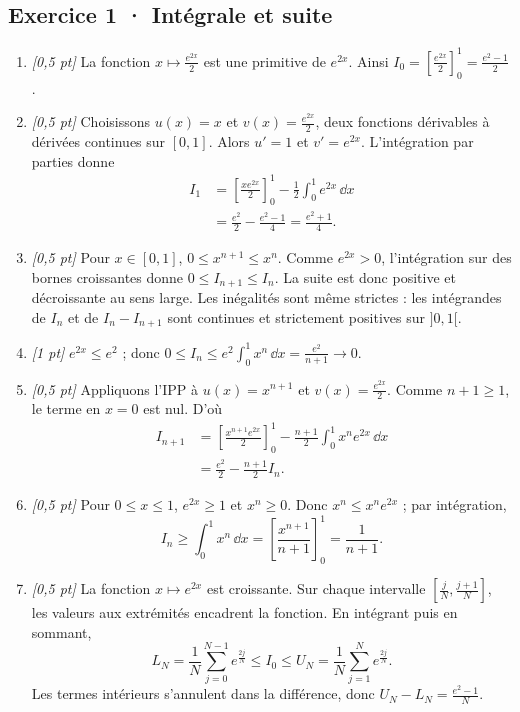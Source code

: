 \subsection*{Exercice 1 · Intégrale et suite}\begin{enumerate}

\item \textit{[0,5 pt]} La fonction $x\mapsto \frac{e^{2x}}{2}$ est une primitive de $e^{2x}$. Ainsi $I_0=[\frac{e^{2x}}{2}]_0^1=\frac{e^{2}-1}{2}$.

\item \textit{[0,5 pt]} Choisissons $u(x)=x$ et $v(x)=\frac{e^{2x}}{2}$, deux fonctions dérivables à dérivées continues sur $[0,1]$. Alors $u'=1$ et $v'=e^{2x}$. L'intégration par parties donne
\[\begin{aligned}I_1&=\left[\frac{xe^{2x}}{2}\right]_0^1-\frac{1}{2}\int_0^1e^{2x}\,\dd x\\&=\frac{e^{2}}{2}-\frac{e^{2}-1}{4}=\frac{e^{2}+1}{4}.\end{aligned}\]

\item \textit{[0,5 pt]} Pour $x\in[0,1]$, $0\le x^{n+1}\le x^n$. Comme $e^{2x}>0$, l'intégration sur des bornes croissantes donne $0\le I_{n+1}\le I_n$. La suite est donc positive et décroissante au sens large. Les inégalités sont même strictes : les intégrandes de $I_n$ et de $I_n-I_{n+1}$ sont continues et strictement positives sur $]0,1[$.

\item \textit{[1 pt]} $e^{2x}\le e^{2}$ ; donc $0\le I_n\le e^{2}\int_0^1x^n\,\dd x=\frac{e^{2}}{n+1}\to0$.

\item \textit{[0,5 pt]} Appliquons l'IPP à $u(x)=x^{n+1}$ et $v(x)=\frac{e^{2x}}{2}$. Comme $n+1\ge1$, le terme en $x=0$ est nul. D'où
\[\begin{aligned}I_{n+1}&=\left[\frac{x^{n+1}e^{2x}}{2}\right]_0^1-\frac{n+1}{2}\int_0^1x^ne^{2x}\,\dd x\\&=\frac{e^{2}}{2}-\frac{n+1}{2}I_n.\end{aligned}\]

\item \textit{[0,5 pt]} Pour $0\le x\le1$, $e^{2x}\ge1$ et $x^n\ge0$. Donc $x^n\le x^ne^{2x}$ ; par intégration,
\[I_n\ge\int_0^1x^n\,\dd x=\left[\frac{x^{n+1}}{n+1}\right]_0^1=\frac{1}{n+1}.\]

\item \textit{[0,5 pt]} La fonction $x\mapsto e^{2x}$ est croissante. Sur chaque intervalle $[\frac{j}{N},\frac{j+1}{N}]$, les valeurs aux extrémités encadrent la fonction. En intégrant puis en sommant,
\[L_N=\frac{1}{N}\sum_{j=0}^{N-1}e^{\frac{2j}{N}}\le I_0\le U_N=\frac{1}{N}\sum_{j=1}^Ne^{\frac{2j}{N}}.\]
Les termes intérieurs s'annulent dans la différence, donc $U_N-L_N=\frac{e^{2}-1}{N}$.


\end{enumerate}
